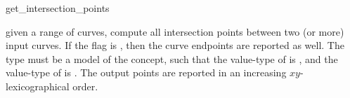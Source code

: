 \ccRefPageBegin

\begin{ccRefFunction}{get_intersection_points}


{given a range of curves, compute all intersection points between two (or more)
 input curves. If the flag  is , then the
 curve endpoints are reported as well. The  type must be a model
 of the  concept, such that the value-type of
  is , and the value-type of
  is .
 The output points are reported in an increasing $xy$-lexicographical order.}

\end{ccRefFunction}

\ccRefPageEnd

